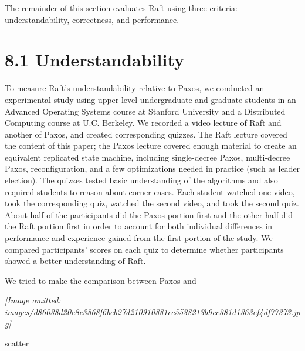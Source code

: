 \documentclass[
]{article}
\begin{document}
The remainder of this section evaluates Raft using three criteria:
understandability, correctness, and performance.

\section{8.1 Understandability}\label{understandability}

To measure Raft's understandability relative to Paxos, we conducted an
experimental study using upper-level undergraduate and graduate students
in an Advanced Operating Systems course at Stanford University and a
Distributed Computing course at U.C. Berkeley. We recorded a video
lecture of Raft and another of Paxos, and created corresponding quizzes.
The Raft lecture covered the content of this paper; the Paxos lecture
covered enough material to create an equivalent replicated state
machine, including single-decree Paxos, multi-decree Paxos,
reconfiguration, and a few optimizations needed in practice (such as
leader election). The quizzes tested basic understanding of the
algorithms and also required students to reason about corner cases. Each
student watched one video, took the corresponding quiz, watched the
second video, and took the second quiz. About half of the participants
did the Paxos portion first and the other half did the Raft portion
first in order to account for both individual differences in performance
and experience gained from the first portion of the study. We compared
participants' scores on each quiz to determine whether participants
showed a better understanding of Raft.

We tried to make the comparison between Paxos and

\textit{[Image omitted: images/d86038d20e8e3868f6beb27d210910881cc5538213b9ec381d1363ef4df77373.jpg]}

scatter
\end{document}
